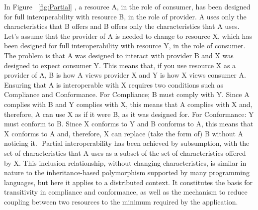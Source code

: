 In Figure ~\ref{fig:Partial} , a resource A, in the role of consumer, has been designed for full interoperability
with resource B, in the role of provider. A uses only the characteristics that B offers and B offers only the
characteristics that A uses. Let's assume that the provider of A is needed to change to resource X, which has been designed for full interoperability with resource Y, in the role of consumer. The problem is that A was designed to interact with provider B and X was designed to expect consumer Y. This means that, if you use resource X as a provider of A, B is how A views provider X and Y is how X views consumer A. Ensuring that A is interoperable with X requires two conditions such as Compliance and Conformance.
For Compliance; B must comply with Y. Since A complies with B and Y complies with X, this means that A complies with X and, therefore, A can use X as if it were B, as it was designed for.
For Conformance: Y must conform to B. Since X conforms to Y and B conforms to A, this means that X conforms to
A and, therefore, X can replace (take the form of) B without A noticing it.  Partial interoperability has been achieved by subsumption, with the set of characteristics that A uses as a subset of the set of characteristics
offered by X. This inclusion relationship, without changing characteristics, is similar in nature to the
inheritance-based polymorphism supported by many programming languages, but here it applies to a distributed context. It constitutes the basis for transitivity in compliance and conformance, as well as the mechanism to reduce coupling between two resources to the minimum required by the application. 



